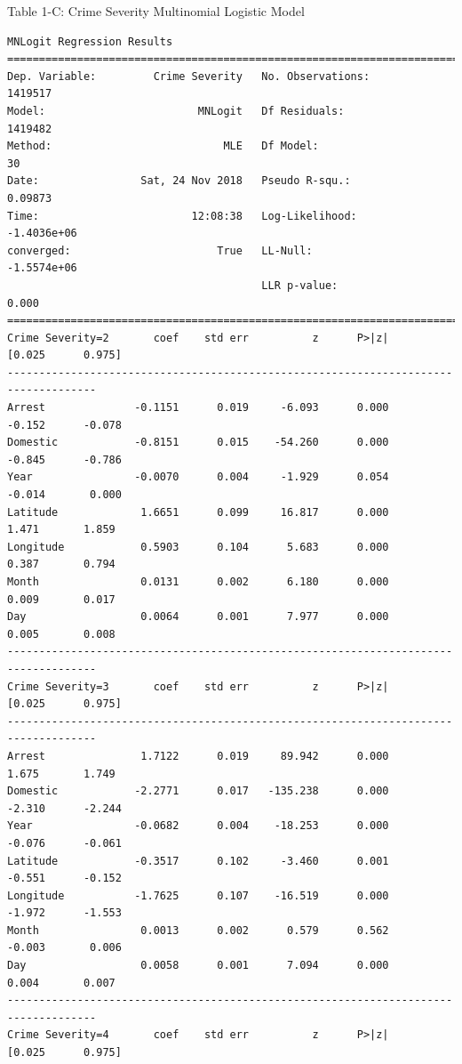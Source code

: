\documentclass[11pt]{article}
\newcommand{\1}{\mathds{1}}
\begin{document}
Table 1-C: Crime Severity Multinomial Logistic Model
\begin{Verbatim}[fontsize=\tiny]
MNLogit Regression Results                          
==============================================================================
Dep. Variable:         Crime Severity   No. Observations:              1419517
Model:                        MNLogit   Df Residuals:                  1419482
Method:                           MLE   Df Model:                           30
Date:                Sat, 24 Nov 2018   Pseudo R-squ.:                 0.09873
Time:                        12:08:38   Log-Likelihood:            -1.4036e+06
converged:                       True   LL-Null:                   -1.5574e+06
                                        LLR p-value:                     0.000
====================================================================================
Crime Severity=2       coef    std err          z      P>|z|      [0.025      0.975]
------------------------------------------------------------------------------------
Arrest              -0.1151      0.019     -6.093      0.000      -0.152      -0.078
Domestic            -0.8151      0.015    -54.260      0.000      -0.845      -0.786
Year                -0.0070      0.004     -1.929      0.054      -0.014       0.000
Latitude             1.6651      0.099     16.817      0.000       1.471       1.859
Longitude            0.5903      0.104      5.683      0.000       0.387       0.794
Month                0.0131      0.002      6.180      0.000       0.009       0.017
Day                  0.0064      0.001      7.977      0.000       0.005       0.008
------------------------------------------------------------------------------------
Crime Severity=3       coef    std err          z      P>|z|      [0.025      0.975]
------------------------------------------------------------------------------------
Arrest               1.7122      0.019     89.942      0.000       1.675       1.749
Domestic            -2.2771      0.017   -135.238      0.000      -2.310      -2.244
Year                -0.0682      0.004    -18.253      0.000      -0.076      -0.061
Latitude            -0.3517      0.102     -3.460      0.001      -0.551      -0.152
Longitude           -1.7625      0.107    -16.519      0.000      -1.972      -1.553
Month                0.0013      0.002      0.579      0.562      -0.003       0.006
Day                  0.0058      0.001      7.094      0.000       0.004       0.007
------------------------------------------------------------------------------------
Crime Severity=4       coef    std err          z      P>|z|      [0.025      0.975]

\end{Verbatim}
\end{document}
